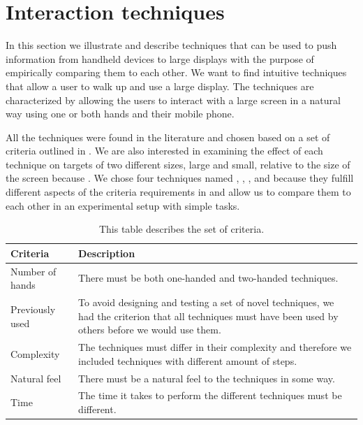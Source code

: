 \section{Interaction techniques} \label{sec:techniques}
In this section we illustrate and describe techniques that can be used to push information from handheld devices to large displays with the purpose of empirically comparing them to each other.
We want to find intuitive techniques that allow a user to walk up and use a large display.
The techniques are characterized by allowing the users to interact with a large screen in a natural way using one or both hands and their mobile phone.

All the techniques were found in the literature and chosen based on a set of criteria outlined in . 
We are also interested in examining the effect of each technique on targets of two different sizes, large and small, relative to the size of the screen because . 
We chose four techniques named \swipe, \tilt, \throw, and \pinch because they fulfill different aspects of the criteria requirements in  and allow us to compare them to each other in an experimental setup with simple tasks.

\begin{table}[H]
	\centering
	\begin{tabular}{|p{}|p{}|}
		\hline
		\rowcolor[HTML]{9B9B9B} 
		\textbf{Criteria} & \textbf{Description} \\ \hline
		Number of hands & There must be both one-handed and two-handed techniques. \\ \hline
		Previously used & To avoid designing and testing a set of novel techniques, we had the criterion that all techniques must have been used by others before we would use them. \\ \hline
		Complexity & The techniques must differ in their complexity and therefore we included techniques with different amount of steps. \\ \hline
		Natural feel & There must be a natural feel to the techniques in some way. \\ \hline
		Time & The time it takes to perform the different techniques must be different. \\ \hline
	\end{tabular}
	\caption{This table describes the set of criteria.}
	\label{tab:techniqueCriteria}
\end{table}


